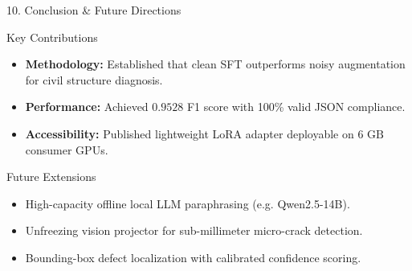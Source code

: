\documentclass[aspectratio=169]{beamer}
\begin{document}
\begin{frame}{10. Conclusion \& Future Directions}
  \begin{block}{Key Contributions}
    \begin{itemize}\small
      \item \textbf{Methodology:} Established that clean SFT outperforms noisy augmentation for civil structure diagnosis.
      \item \textbf{Performance:} Achieved $0.9528$ F1 score with 100\% valid JSON compliance.
      \item \textbf{Accessibility:} Published lightweight LoRA adapter deployable on $6\text{ GB}$ consumer GPUs.
    \end{itemize}
  \end{block}
  \vspace{0.2cm}
  \begin{block}{Future Extensions}
    \begin{itemize}\small
      \item High-capacity offline local LLM paraphrasing (e.g. Qwen2.5-14B).
      \item Unfreezing vision projector for sub-millimeter micro-crack detection.
      \item Bounding-box defect localization with calibrated confidence scoring.
    \end{itemize}
  \end{block}
\end{frame}
\end{document}
